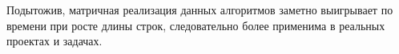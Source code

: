 \documentclass[12pt]{report}
\begin{document}
Подытожив, матричная реализация данных алгоритмов заметно выигрывает по времени при росте длины строк, следовательно более применима в реальных проектах и задачах.
\newpage
{}
\nocite{*}
\end{document}
